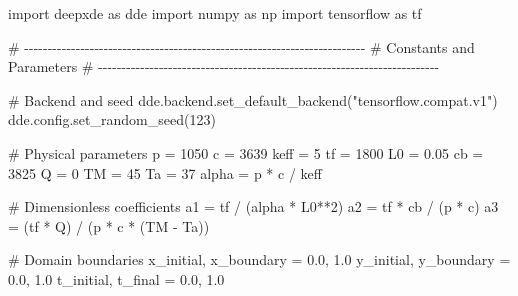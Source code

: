 \documentclass[
  spanish,
  us-letterpaper,
  DIV=11,
  numbers=noendperiod]{scrreprt}
\newenvironment{Shaded}{\begin{snugshade}}{\end{snugshade}}
\newcommand{\CommentTok}[1]{\textcolor[rgb]{0.37,0.37,0.37}{#1}}
\newcommand{\DecValTok}[1]{\textcolor[rgb]{0.68,0.00,0.00}{#1}}
\newcommand{\FloatTok}[1]{\textcolor[rgb]{0.68,0.00,0.00}{#1}}
\newcommand{\ImportTok}[1]{\textcolor[rgb]{0.00,0.46,0.62}{#1}}
\newcommand{\NormalTok}[1]{\textcolor[rgb]{0.00,0.23,0.31}{#1}}
\newcommand{\OperatorTok}[1]{\textcolor[rgb]{0.37,0.37,0.37}{#1}}
\newcommand{\StringTok}[1]{\textcolor[rgb]{0.13,0.47,0.30}{#1}}
\theoremstyle{plain}
\theoremstyle{definition}
\theoremstyle{remark}
\begin{document}
\begin{Shaded}
\begin{Highlighting}[]
\ImportTok{import}\NormalTok{ deepxde }\ImportTok{as}\NormalTok{ dde}
\ImportTok{import}\NormalTok{ numpy }\ImportTok{as}\NormalTok{ np}
\ImportTok{import}\NormalTok{ tensorflow }\ImportTok{as}\NormalTok{ tf}

\CommentTok{\# {-}{-}{-}{-}{-}{-}{-}{-}{-}{-}{-}{-}{-}{-}{-}{-}{-}{-}{-}{-}{-}{-}{-}{-}{-}{-}{-}{-}{-}{-}{-}{-}{-}{-}{-}{-}{-}{-}{-}{-}{-}{-}{-}{-}{-}{-}{-}{-}{-}{-}{-}{-}{-}{-}{-}{-}{-}{-}{-}{-}{-}{-}{-}{-}{-}{-}{-}{-}{-}{-}{-}{-}{-}}
\CommentTok{\# Constants and Parameters}
\CommentTok{\# {-}{-}{-}{-}{-}{-}{-}{-}{-}{-}{-}{-}{-}{-}{-}{-}{-}{-}{-}{-}{-}{-}{-}{-}{-}{-}{-}{-}{-}{-}{-}{-}{-}{-}{-}{-}{-}{-}{-}{-}{-}{-}{-}{-}{-}{-}{-}{-}{-}{-}{-}{-}{-}{-}{-}{-}{-}{-}{-}{-}{-}{-}{-}{-}{-}{-}{-}{-}{-}{-}{-}{-}{-}}

\CommentTok{\# Backend and seed}
\NormalTok{dde.backend.set\_default\_backend(}\StringTok{"tensorflow.compat.v1"}\NormalTok{)}
\NormalTok{dde.config.set\_random\_seed(}\DecValTok{123}\NormalTok{)}

\CommentTok{\# Physical parameters}
\NormalTok{p }\OperatorTok{=} \DecValTok{1050}
\NormalTok{c }\OperatorTok{=} \DecValTok{3639}
\NormalTok{keff }\OperatorTok{=} \DecValTok{5}
\NormalTok{tf }\OperatorTok{=} \DecValTok{1800}
\NormalTok{L0 }\OperatorTok{=} \FloatTok{0.05}
\NormalTok{cb }\OperatorTok{=} \DecValTok{3825}
\NormalTok{Q }\OperatorTok{=} \DecValTok{0}
\NormalTok{TM }\OperatorTok{=} \DecValTok{45}
\NormalTok{Ta }\OperatorTok{=} \DecValTok{37}
\NormalTok{alpha }\OperatorTok{=}\NormalTok{ p }\OperatorTok{*}\NormalTok{ c }\OperatorTok{/}\NormalTok{ keff}

\CommentTok{\# Dimensionless coefficients}
\NormalTok{a1 }\OperatorTok{=}\NormalTok{ tf }\OperatorTok{/}\NormalTok{ (alpha }\OperatorTok{*}\NormalTok{ L0}\OperatorTok{**}\DecValTok{2}\NormalTok{)}
\NormalTok{a2 }\OperatorTok{=}\NormalTok{ tf }\OperatorTok{*}\NormalTok{ cb }\OperatorTok{/}\NormalTok{ (p }\OperatorTok{*}\NormalTok{ c)}
\NormalTok{a3 }\OperatorTok{=}\NormalTok{ (tf }\OperatorTok{*}\NormalTok{ Q) }\OperatorTok{/}\NormalTok{ (p }\OperatorTok{*}\NormalTok{ c }\OperatorTok{*}\NormalTok{ (TM }\OperatorTok{{-}}\NormalTok{ Ta))}

\CommentTok{\# Domain boundaries}
\NormalTok{x\_initial, x\_boundary }\OperatorTok{=} \FloatTok{0.0}\NormalTok{, }\FloatTok{1.0}
\NormalTok{y\_initial, y\_boundary }\OperatorTok{=} \FloatTok{0.0}\NormalTok{, }\FloatTok{1.0}
\NormalTok{t\_initial, t\_final }\OperatorTok{=} \FloatTok{0.0}\NormalTok{, }\FloatTok{1.0}


\end{Highlighting}
\end{Shaded}
\end{document}
